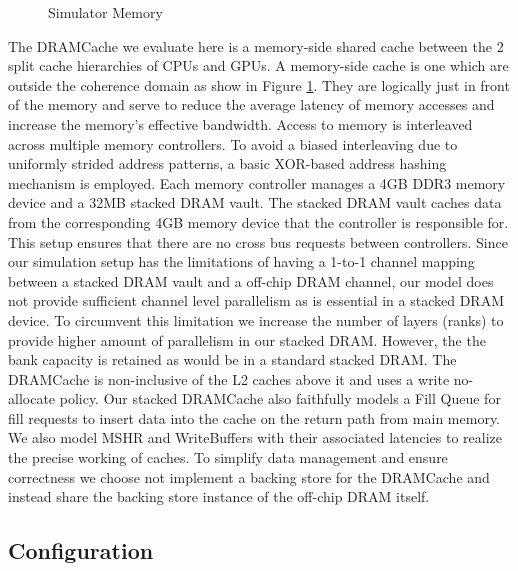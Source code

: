 \begin{figure}[!htb]
	\centering
	\def\svgwidth{0.9\columnwidth}
	
	\caption{Simulator Memory}
	\label{fig:simulator-memory}
\end{figure}

\par The DRAMCache we evaluate here is a memory-side \cite{skylake} shared cache between the 2 split cache hierarchies of CPUs and GPUs. A memory-side cache is one which are outside the coherence domain as show in Figure \ref{fig:simulator-memory}. They are logically just in front of the memory and serve to reduce the average latency of memory accesses and increase the memory's effective bandwidth. Access to memory is interleaved across multiple memory controllers. To avoid a biased interleaving due to uniformly strided address patterns, a basic XOR-based address hashing mechanism is employed. Each memory controller manages a 4GB DDR3 memory device and a 32MB stacked DRAM vault. The stacked DRAM vault caches data from the corresponding 4GB memory device that the controller is responsible for. This setup ensures that there are no cross bus requests between controllers. Since our simulation setup has the limitations of having a 1-to-1 channel mapping between a stacked DRAM vault and a off-chip DRAM channel, our model does not provide sufficient channel level parallelism as is essential in a stacked DRAM device. To circumvent this limitation we increase the number of layers (ranks) to provide higher amount of parallelism in our stacked DRAM. However, the the bank capacity is retained as would be in a standard stacked DRAM. The DRAMCache is non-inclusive  \cite{coherence-dramcache} of the L2 caches above it and uses a write no-allocate policy. Our stacked DRAMCache also faithfully models  a Fill Queue \cite{dca} for fill requests to insert data into the cache on the return path from main memory. We also model MSHR and WriteBuffers with their associated latencies to realize the precise working of caches. To simplify data management and ensure correctness we choose not implement a backing store for the DRAMCache and instead share the backing store instance of the off-chip DRAM itself.


\subsection{Configuration} 

